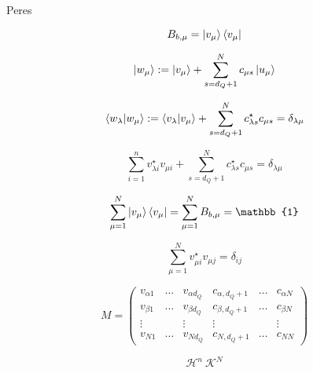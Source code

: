 Peres \cite{peres1995}

\begin{equation}
B_{b,\mu} = \ket{v_{\mu}} \bra{v_{\mu}}
\end{equation}

\begin{equation}
\ket{w_{\mu}} := \ket{v_{\mu}} + \sum_{s=d_{Q}+1}^{N} c_{\mu s} \ket{u_{\mu}}
\end{equation}

\begin{equation}
\bra{w_{\lambda}} \ket{w_{\mu}} := \bra{v_{\lambda}} \ket{v_{\mu}} + \sum_{s=d_{Q}+1}^{N} c_{\lambda s}^{\star} c_{\mu s} = \delta_{\lambda \mu}
\end{equation}

\begin{equation}
\sum_{i=1}^{n} v_{\lambda i}^{\star} v_{\mu i} + \sum_{s=d_{Q}+1}^{N} c_{\lambda s}^{\star} c_{\mu s} = \delta_{\lambda \mu}
\end{equation}

\begin{equation}
\sum_{\mu=1}^{N}\ket{v_{\mu}}\bra{v_{\mu}} = \sum_{\mu=1}^{N} B_{b,\mu} = \mathbb{1}
\end{equation}


\begin{equation}
\sum_{\mu=1}^{N}v_{\mu i}^{\star} v_{\mu j} = \delta_{ij}
\end{equation}

\begin{equation}
M = 
\begin{pmatrix}
v_{\alpha 1} & \dots & v_{\alpha d_{Q}} & c_{\alpha,d_{Q}+1} & \dots & c_{\alpha N} \\
v_{\beta 1} & \dots & v_{\beta d_{Q}} & c_{\beta,d_{Q}+1} & \dots & c_{\beta N} \\
\vdots &  & \vdots & \vdots &  & \vdots \\
v_{N1} & \dots & v_{Nd_{Q}} & c_{N,d_Q+1} & \dots & c_{NN}
\end{pmatrix}    
\end{equation}

\[\mathcal{H}^{n}\ \mathcal{K}^{N}\]